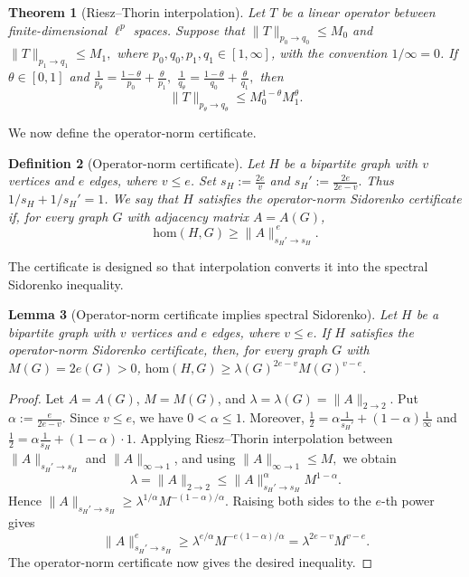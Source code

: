 \documentclass[10pt,a4paper]{amsart}
\newtheorem{theorem}{Theorem}[section]
\newtheorem{lemma}[theorem]{Lemma}
\newtheorem{definition}[theorem]{Definition}
\newcommand{\homc}{\mathrm{hom}}
\begin{document}
\begin{theorem}[Riesz--Thorin interpolation]
\label{thm:riesz-thorin}
Let \(T\) be a linear operator between finite-dimensional \(\ell^p\)
spaces.  Suppose that
       $ \|T\|_{p_0\to q_0}\le M_0$ and 
       $ \|T\|_{p_1\to q_1}\le M_1,$
where \(p_0,q_0,p_1,q_1\in[1,\infty]\), with the convention
\(1/\infty=0\).  If \(\theta\in[0,1]\) and
        $\frac1{p_\theta}
        =
        \frac{1-\theta}{p_0}
        +
        \frac{\theta}{p_1},$
$        \frac1{q_\theta}
        =
        \frac{1-\theta}{q_0}
        +
        \frac{\theta}{q_1},
$
then
\[
        \|T\|_{p_\theta\to q_\theta}
        \le
        M_0^{1-\theta}M_1^\theta .
\]
\end{theorem}

We now define the operator-norm certificate.

\begin{definition}[Operator-norm certificate]
Let \(H\) be a bipartite graph with \(v\) vertices and \(e\) edges, where
\(v\le e\).  Set
        $s_H:=\frac{2e}{v}$ and 
$        s_H':=\frac{2e}{2e-v}.
$
Thus \(1/s_H+1/s_H'=1\).  We say that \(H\) satisfies the
\emph{operator-norm Sidorenko certificate} if, for every graph \(G\) with
adjacency matrix \(A=A(G)\),
\[
        \homc(H,G)\ge \|A\|_{s_H'\to s_H}^{\,e}.
\]
\end{definition}

The certificate is designed so that interpolation converts it into the
spectral Sidorenko inequality.

\begin{lemma}[Operator-norm certificate implies spectral Sidorenko]
\label{lem:operator-certificate}
Let \(H\) be a bipartite graph with \(v\) vertices and \(e\) edges, where
\(v\le e\).  If \(H\) satisfies the operator-norm Sidorenko certificate,
then, for every graph \(G\) with \(M(G)=2e(G)>0\),
$        \homc(H,G)
        \ge
        \lambda(G)^{2e-v}M(G)^{v-e}.$
\end{lemma}

\begin{proof}
Let \(A=A(G)\), \(M=M(G)\), and
\(\lambda=\lambda(G)=\|A\|_{2\to2}\).  Put
        $\alpha:=\frac{e}{2e-v}.$
Since \(v\le e\), we have \(0<\alpha\le1\).  Moreover,
        $\frac12
        =
        \alpha\frac1{s_H'}
        +
        (1-\alpha)\frac1\infty$ and
        $\frac12
        =
        \alpha\frac1{s_H}
        +
        (1-\alpha)\cdot 1.$
Applying Riesz--Thorin interpolation between
\(\|A\|_{s_H'\to s_H}\) and \(\|A\|_{\infty\to1}\), and using
       $ \|A\|_{\infty\to1}\le M,$
we obtain
\[
        \lambda
        =
        \|A\|_{2\to2}
        \le
        \|A\|_{s_H'\to s_H}^{\alpha}M^{1-\alpha}.
\]
Hence
     $   \|A\|_{s_H'\to s_H}
        \ge
        \lambda^{1/\alpha}M^{-(1-\alpha)/\alpha}.$
Raising both sides to the \(e\)-th power gives
\[
        \|A\|_{s_H'\to s_H}^{e}
        \ge
        \lambda^{e/\alpha}M^{-e(1-\alpha)/\alpha}
        =
        \lambda^{2e-v}M^{v-e}.
\]
The operator-norm certificate now gives the desired inequality.
\end{proof}
\end{document}
